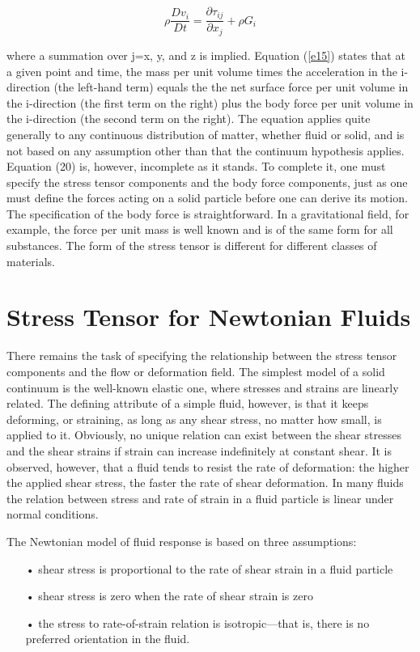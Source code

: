 \documentclass{article}
\begin{document}
{\begin{equation}
\rho \frac{Dv_{i}}{Dt} = \frac{\partial \tau_{ij}}{\partial x_{j}} + \rho G_{i} \label{e15}
\end{equation}

where a summation over j=x, y, and z is implied. Equation (\ref{e15}) states that at a given point and time, the mass per unit volume times the acceleration in the i-direction (the left-hand
term) equals the the net surface force per unit volume in the i-direction (the first term on the
right) plus the body force per unit volume in the i-direction (the second term on the right). The equation applies quite generally to any continuous distribution of matter, whether fluid or solid, and is not based on any assumption other than that the continuum hypothesis applies. Equation (20) is, however, incomplete as it stands. To complete it, one must specify the stress tensor components and the body force components, just as one must define the forces acting on a solid particle before one can derive its motion. The specification of the body force is straightforward. In a gravitational field, for example, the force per unit mass is well known and is of the same form for all substances. The form of the stress tensor is different for different classes of materials.

\section*{Stress Tensor for Newtonian Fluids}

There remains the task of specifying the relationship between the stress tensor components and the flow or deformation field. The simplest model of a solid continuum is the well-known elastic one, where stresses and strains are linearly related. The defining attribute of a simple fluid, however, is that it keeps deforming, or straining, as long as any shear stress, no matter how small, is applied to it. Obviously, no unique relation can exist between the shear stresses and the shear strains if strain can increase indefinitely at constant shear. It is observed, however, that a fluid tends to resist the rate of deformation: the higher the applied shear stress, the faster the rate of shear deformation. In many fluids the relation between stress and rate of strain in a fluid particle is linear under normal conditions.

The Newtonian model of fluid response is based on three assumptions:
\begin{itemize}
\item[•] shear stress is proportional to the rate of shear strain in a fluid particle
\item[•] shear stress is zero when the rate of shear strain is zero
\item[•] the stress to rate-of-strain relation is isotropic—that is, there is no preferred orientation in the fluid.
\end{itemize}

}
\end{document}

